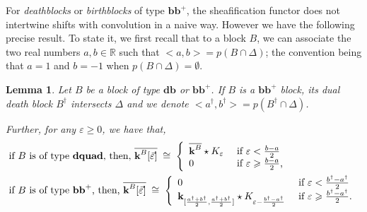 \documentclass[a4paper, english, 11pt]{article}
\newcommand{\kk}[0]{\textbf{k}}
\newcommand{\0}{\vec{0}}
\newcommand{\R}[0]{\mathbb{R}}
\newtheorem{lem}[prop]{Lemma}
\begin{document}
For \emph{deathblocks} or \emph{birthblocks} of type $\textbf{bb}^{+}$, the sheafification functor does not intertwine shifts with convolution in a naive way. 
However we have the following precise result. To state it,  we first 
recall that to a block $B$, we can associate the two real numbers $a,b\in \R$ such that $<a,b> = p(B\cap \Delta)$;  the convention being that $a=1$ and $b=-1$ when $ p(B\cap \Delta) = \emptyset$. 
\begin{lem}\label{L:Barondeathblocks}Let $B$ be a block of type $\textbf{db}$ or $\textbf{bb}^{+}$. If $B$ is a $\textbf{bb}^{+}$ block, its dual death block $B^\dagger$ intersects $\Delta$ and we denote $<a^\dagger,b^\dagger> = p(B^\dagger \cap \Delta)$.

Further, for any $\varepsilon \geq 0$, we have that,
 \begin{align}
 &\text{if $B$ is of type \textbf{dquad}, then, } \overline{\kk^{B}[\vec{\varepsilon}] }
 \; \cong \; \left\{ \begin{array}{ll}  \overline{\kk^{B}}\star K_{\varepsilon} & \mbox{ if $\varepsilon< \frac{b-a}{2}$}\\
 0 & \mbox{ if $\varepsilon \geqslant \frac{b-a}{2}$,} \end{array}                                                                                                                          \right .  \label{eq:Barofdb}\\
& \text{if $B$ is of type $\textbf{bb}^{+}$, then, }\overline{\kk^{B}[\vec{\varepsilon}]} 
 \;\cong \;  \left\{ \begin{array}{ll}  0 & \mbox{ if $\varepsilon< \frac{b^\dagger-a^\dagger}{2}$}\\
 \kk_{[\frac{a^\dagger+b^\dagger}{2}, \frac{a^\dagger+b^\dagger}{2}]}\star K_{\varepsilon -\frac{b^\dagger -a^\dagger}{2}} & \mbox{ if $\varepsilon \geqslant \frac{b^\dagger-a^\dagger}{2}$.} \end{array}                                                                                                                          \right .  \label{eq:Barofbb+}
 \end{align}
\end{lem}
\end{document}
